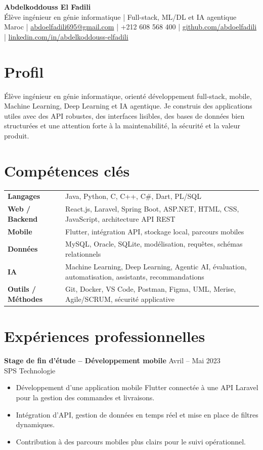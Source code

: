 \documentclass[10pt,a4paper]{article}
\newcommand{\entry}[4]{
  \textbf{#1} \hfill {\small\color{muted} #2}\\
  {\color{accent}#3}\\[-2pt]
  #4
}
\begin{document}
{\Huge\bfseries Abdelkoddouss El Fadili}\\[3pt]
{\large Élève ingénieur en génie informatique | Full-stack, ML/DL et IA agentique}\\[6pt]
Maroc \quad | \quad
\href{mailto:abdoelfadili695@gmail.com}{abdoelfadili695@gmail.com} \quad | \quad
+212 608 568 400 \quad | \quad
\href{https://github.com/abdoelfadili}{github.com/abdoelfadili} \quad | \quad
\href{https://www.linkedin.com/in/abdelkoddouss-elfadili/}{linkedin.com/in/abdelkoddouss-elfadili}

\section*{Profil}
Élève ingénieur en génie informatique, orienté développement full-stack, mobile, Machine Learning, Deep Learning et IA agentique. Je construis des applications utiles avec des API robustes, des interfaces lisibles, des bases de données bien structurées et une attention forte à la maintenabilité, la sécurité et la valeur produit.

\section*{Compétences clés}
\begin{tabularx}{\textwidth}{>{\bfseries}p{3.2cm} X}
Langages & Java, Python, C, C++, C\#, Dart, PL/SQL \\
Web / Backend & React.js, Laravel, Spring Boot, ASP.NET, HTML, CSS, JavaScript, architecture API REST \\
Mobile & Flutter, intégration API, stockage local, parcours mobiles \\
Données & MySQL, Oracle, SQLite, modélisation, requêtes, schémas relationnels \\
IA & Machine Learning, Deep Learning, Agentic AI, évaluation, automatisation, assistants, recommandations \\
Outils / Méthodes & Git, Docker, VS Code, Postman, Figma, UML, Merise, Agile/SCRUM, sécurité applicative \\
\end{tabularx}

\section*{Expériences professionnelles}
\entry{Stage de fin d'étude -- Développement mobile}{Avril -- Mai 2023}{SPS Technologie}{
\begin{itemize}
  \item Développement d'une application mobile Flutter connectée à une API Laravel pour la gestion des commandes et livraisons.
  \item Intégration d'API, gestion de données en temps réel et mise en place de filtres dynamiques.
  \item Contribution à des parcours mobiles plus clairs pour le suivi opérationnel.
\end{itemize}
}
\end{document}
